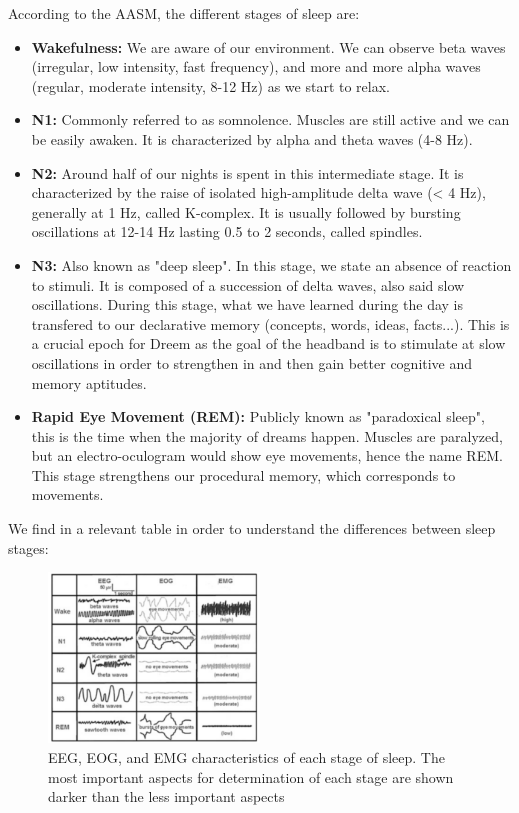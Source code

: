 \documentclass[12pt]{report}
\begin{document}
According to the AASM, the different stages of sleep are:
\begin{itemize}
	\item \textbf{Wakefulness:} We are aware of our environment. We can observe beta waves (irregular, low intensity, fast frequency), and more and more alpha waves (regular, moderate intensity, 8-12 Hz) as we start to relax.
	\item \textbf{N1:} Commonly referred to as somnolence. Muscles are still active and we can be easily awaken. It is characterized by alpha and theta waves (4-8 Hz).
	\item \textbf{N2:} Around half of our nights is spent in this intermediate stage. It is characterized by the raise of isolated high-amplitude delta wave (< 4 Hz), generally at 1 Hz, called K-complex. It is usually followed by bursting oscillations at 12-14 Hz lasting 0.5 to 2 seconds, called spindles.
	\item \textbf{N3:} Also known as "deep sleep". In this stage, we state an absence of reaction to stimuli. It is composed of a succession of delta waves, also said slow oscillations. During this stage, what we have learned during the day is transfered to our declarative memory (concepts, words, ideas, facts...). This is a crucial epoch for Dreem as the goal of the headband is to stimulate at slow oscillations in order to strengthen in and then gain better cognitive and memory aptitudes.
	\item \textbf{Rapid Eye Movement (REM):} Publicly known as "paradoxical sleep", this is the time when the majority of dreams happen. Muscles are paralyzed, but an electro-oculogram would show eye movements, hence the name REM. This stage strengthens our procedural memory, which corresponds to movements. 
\end{itemize}

We find in \cite{moorcroft2003understanding} a relevant table in order to understand the differences between sleep stages: 

\begin{figure}[H]
\centering
\includegraphics[width=0.5\textwidth]{img/chap2/stages.png}
\caption{\label{fig:stages}EEG, EOG, and EMG characteristics of each stage of sleep. The most important aspects for determination of each stage are shown darker than the less important aspects}
\end{figure}
\end{document}
